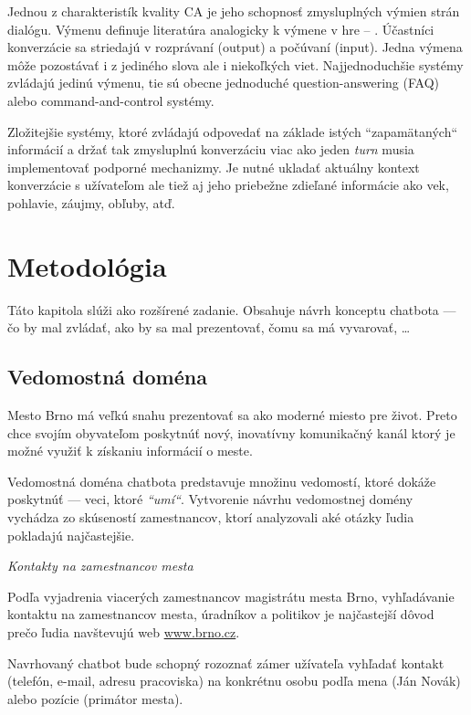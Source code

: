 \documentclass{ExcelAtFIT}
\begin{document}
Jednou z charakteristík kvality CA je jeho schopnosť zmysluplných výmien strán dialógu. Výmenu definuje literatúra analogicky k výmene v hre -- \textit{}. 
Účastníci konverzácie sa striedajú v rozprávaní (output) a počúvaní (input). \cite{jurafsky_2019} Jedna výmena môže pozostávať i z jediného slova ale i niekoľkých viet. Najjednoduchšie systémy zvládajú jedinú výmenu, tie sú obecne jednoduché question-answering (FAQ) alebo command-and-control systémy.

Zložitejšie systémy, ktoré zvládajú odpovedať na základe istých ``zapamätaných`` informácií a držať tak zmysluplnú konverzáciu viac ako jeden \textit{turn} musia implementovať podporné mechanizmy.
Je nutné ukladať aktuálny kontext konverzácie s užívateľom ale tiež aj jeho priebežne zdieľané informácie ako vek, pohlavie, záujmy, obľuby, atď.


\section{Metodológia}

Táto kapitola slúži ako rozšírené zadanie. Obsahuje návrh konceptu chatbota --- čo by mal zvládať, ako by sa mal prezentovať, čomu sa má vyvarovať, \dots

\subsection{Vedomostná doména}
Mesto Brno má veľkú snahu prezentovať sa ako moderné miesto pre život. Preto chce svojím obyvateľom poskytnúť nový, inovatívny komunikačný kanál ktorý je možné využiť k získaniu informácií o meste.

Vedomostná doména chatbota predstavuje množinu vedomostí, ktoré dokáže poskytnúť --- veci, ktoré \emph{``umí``}. Vytvorenie návrhu vedomostnej domény vychádza zo skúseností zamestnancov, ktorí analyzovali aké otázky ľudia pokladajú najčastejšie.

\vspace{2mm}
\textit{Kontakty na zamestnancov mesta}


\noindent Podľa vyjadrenia viacerých zamestnancov magistrátu mesta Brno, vyhľadávanie kontaktu na zamestnancov mesta, úradníkov a politikov je najčastejší dôvod prečo ľudia navštevujú web \url{www.brno.cz}.

Navrhovaný chatbot bude schopný rozoznať zámer užívateľa vyhľadať kontakt (telefón, e-mail, adresu pracoviska) na konkrétnu osobu podľa mena (Ján Novák) alebo pozície (primátor mesta).
\end{document}
